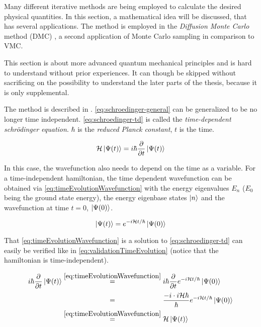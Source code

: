 Many different iterative methods are being employed to calculate the desired physical quantities.
In this section, a mathematical idea will be discussed, that has several applications.
The method is employed in the \emph{Diffusion Monte Carlo} method (DMC) \cite{quantumMonteCarloSimulationsOfSolids}, a second application of Monte Carlo sampling in comparison to VMC.

This section is about more advanced quantum mechanical principles and is hard to understand without prior experiences. It can though be skipped without sacrificing on the possibility to understand the later parts of the thesis, because it is only supplemental.

The method is described in \cite{imagenarySchroedingerEquation}.
\autoref{eq:schroedinger-general} can be generalized to be no longer time independent. 
\autoref{eq:schroedinger-td} is called the \emph{time-dependent schrödinger equation}. $\hbar$ is the \emph{reduced Planck constant}, $t$ is the time.

\begin{equation}
    \label{eq:schroedinger-td}
    \mathcal{H} \ket{\Psi(t)} = i\hbar \frac{\partial }{\partial t} \ket{\Psi(t)}
\end{equation}

In this case, the wavefunction also needs to depend on the time as a variable.
For a time-independent hamiltonian, the time dependent wavefunction can be obtained via \autoref{eq:timeEvolutionWavefunction} \cite{schwablQM} with the energy eigenvalues $E_n$ ($E_0$ being the ground state energy), the energy eigenbase states $\ket{n}$ and the wavefunction at time $t=0$, $\ket{\Psi(0)}$.

\begin{equation}
    \label{eq:timeEvolutionWavefunction}
        \ket{\Psi(t)} = e^{-i\mathcal{H} t / \hbar} \ket{\Psi(0)}
\end{equation}

That \autoref{eq:timeEvolutionWavefunction} is a solution to \autoref{eq:schroedinger-td} can easily be verified like in \autoref{eq:validationTimeEvolution} (notice that the hamiltonian is time-independent).

\begin{equation}
    \label{eq:validationTimeEvolution}
    \begin{split}
        i\hbar \frac{\partial }{\partial t} \ket{\Psi(t)} &\stackrel{\ref{eq:timeEvolutionWavefunction}}{=} 
        i\hbar \frac{\partial }{\partial t}  e^{-i\hamiltonian t / \hbar} \ket{\Psi(0)}\\
        &\stackrel{\phantom{\ref{eq:timeEvolutionWavefunction}}}{=} \frac{-i\cdot i \hamiltonian \hbar}{\hbar} e^{-i\hamiltonian t / \hbar} \ket{\Psi(0)}\\
        &\stackrel{\ref{eq:timeEvolutionWavefunction}}{=} \hamiltonian \ket{\Psi(t)}
    \end{split}
\end{equation}

